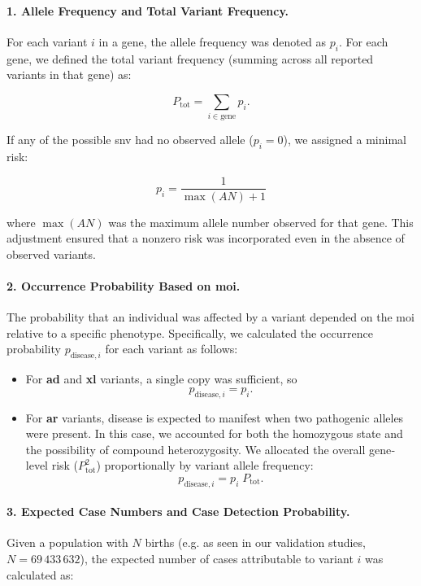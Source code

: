 \paragraph{1. Allele Frequency and Total Variant Frequency.} 
\label{sec:min_risk}
For each variant \(i\) in a gene, the allele frequency was denoted as \(p_i\). For each gene, we defined the total variant frequency (summing across all reported variants in that gene) as:

\[P_{\text{tot}} = \sum_{i \in \text{gene}} p_i.\]

If any of the possible \ac{snv}  had no observed allele (\(p_i = 0\)), we assigned a minimal risk:

\[p_i = \frac{1}{\max(AN) + 1}\]

where \(\max(AN)\) was the maximum allele number observed for that gene. This adjustment ensured that a nonzero risk was incorporated even in the absence of observed variants.

\paragraph{2. Occurrence Probability Based on \ac{moi}.}
The probability that an individual was affected by a variant depended on the \ac{moi} relative to a specific phenotype. Specifically, we calculated the occurrence probability \(p_{\text{disease},i}\) for each variant as follows:
\begin{itemize}
    \item For \textbf{\ac{ad}} and \textbf{\ac{xl}} variants, a single copy was sufficient, so
    \[
    p_{\text{disease},i} = p_i.
    \]
    \item For \textbf{\ac{ar}} variants, disease is expected to manifest when two pathogenic alleles were present. In this case, we accounted for both the homozygous state and the possibility of compound heterozygosity.
     We allocated the overall gene‐level risk ($P_{\text{tot}}^2$) proportionally by variant allele frequency:
    \[p_{\text{disease},i} = p_i \; P_{\text{tot}}.\] %
\end{itemize}

\paragraph{3. Expected Case Numbers and Case Detection Probability.}
Given a population with \(N\) births (e.g. as seen in our validation studies, \(N = 69\,433\,632\)), the expected number of cases attributable to variant \(i\) was calculated as:

